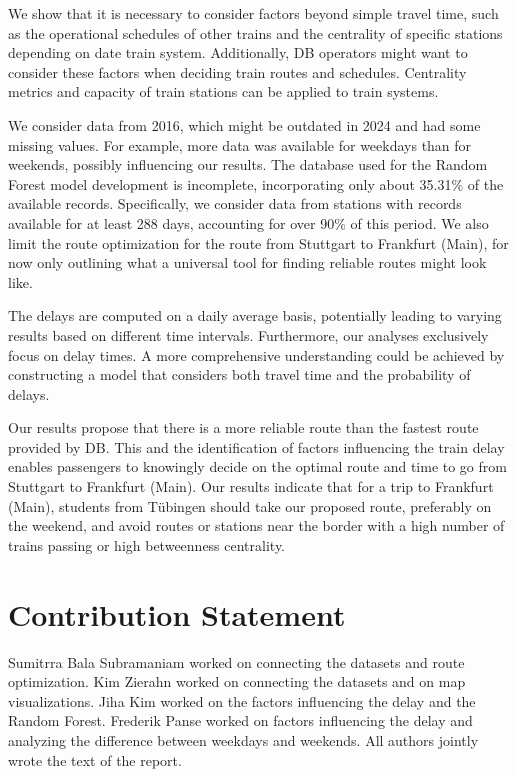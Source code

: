 \documentclass{article}
\theoremstyle{plain}
\theoremstyle{definition}
\theoremstyle{remark}
\begin{document}
We show that it is necessary to consider factors beyond simple travel time, such as the operational schedules of other trains and the centrality of specific stations depending on date train system. Additionally, DB operators might want to consider these factors when deciding train routes and schedules. Centrality metrics and capacity of train stations can be applied to train systems. 

We consider data from 2016, which might be outdated in 2024 and had some missing values. For example, more data was available for weekdays than for weekends, possibly influencing our results. The database used for the Random Forest model development is incomplete, incorporating only about 35.31\% of the available records. Specifically, we consider data from stations with records available for at least 288 days, accounting for over 90\% of this period. We also limit the route optimization for the route from Stuttgart to Frankfurt (Main), for now only outlining what a universal tool for finding reliable routes might look like.

The delays are computed on a daily average basis, potentially leading to varying results based on different time intervals. Furthermore, our analyses exclusively focus on delay times. A more comprehensive understanding could be achieved by constructing a model that considers both travel time and the probability of delays. 

Our results propose that there is a more reliable route than the fastest route provided by DB. This and the identification of factors influencing the train delay enables passengers to knowingly decide on the optimal route and time to go from Stuttgart to Frankfurt (Main). Our results indicate that for a trip to Frankfurt (Main), students from Tübingen should take our proposed route, preferably on the weekend, and avoid routes or stations near the border with a high number of trains passing or high betweenness centrality. 


\section*{Contribution Statement}

Sumitrra Bala Subramaniam worked on connecting the datasets and route optimization. Kim Zierahn worked on connecting the datasets and on map visualizations. Jiha Kim worked on the factors influencing the delay and the Random Forest. Frederik Panse worked on factors influencing the delay and analyzing the difference between weekdays and weekends. All authors jointly wrote the text of the report.






\end{document}
